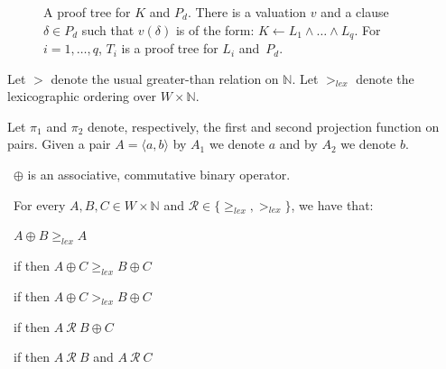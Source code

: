 \documentclass[english]{tlp}
\renewcommand{\mathit}{\displaystyle}
\begin{document}
\begin{figure}[ht]
\begin{center}
\end{center}
\vspace{-3mm}
\caption{A proof tree for $K$ and $P_d$. There is a valuation $v$ and  a clause $\delta\in P_d$ such that $v(\delta)$ is of the form:
$K\leftarrow L_1\wedge \ldots \wedge L_q$.
For $i=1,\ldots,q$, $T_i$ is a proof tree for $L_i$ and~$P_d$.
\label{fig:sigma-tight-lemma}}
\end{figure}



\medskip


\noindent Let $>$ denote the usual greater-than relation 
on $\mathbb N$. 
Let $>_{\mathit{lex}}$ denote the lexicographic ordering
over $W\times\mathbb N$. 

Let $\pi_1$ and $\pi_2$ denote, respectively, the first and second projection function on pairs. Given a pair
$A=\langle a,b\rangle$ by $A_1$ we denote $a$ and by $A_2$ we denote
$b$.

\begin{lemma}
\label{lemma:properties_of_oplus}
\noindent{}~$\oplus$ is an associative, commutative
binary operator.

\noindent{}~For every $A,B,C\in W\times \mathbb N$ and
${\mathcal R}\in\{\geq_{\mathit lex},>_{\mathit lex}\}$, we have 
that\/{\rm{:}}

\noindent{}~$A \oplus B\geq_{\mathit{lex}} A$

\noindent{}~if \makebox[57mm][l]{$A \geq_{\mathit lex}
B$} then $A\oplus C\geq_{\mathit{lex}} B\oplus C$

\noindent{}~if \makebox[57mm][l]{$A>_{\mathit lex}
B$, $A_1\geq C_1$, and $A_2>0$} then $A\oplus C>_{\mathit{lex}}
B\oplus C$

\noindent{}~if  then $A\ {\mathcal R}\ B\oplus C$

\noindent{}~if   then $A\ {\mathcal R}\ B$ and $A\ {\mathcal R}\ C$
\end{lemma}
 
\end{document}
